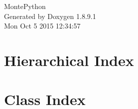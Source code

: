 \documentclass[twoside]{book}
\newcommand{\+}{\discretionary{\mbox{\scriptsize$\hookleftarrow$}}{}{}}
\newcommand{\clearemptydoublepage}{%
  \newpage{\pagestyle{empty}\cleardoublepage}%
}
\begin{document}
\hypersetup{pageanchor=false,
             bookmarks=true,
             bookmarksnumbered=true,
             pdfencoding=unicode
            }
\begin{titlepage}
\vspace*{7cm}
\begin{center}%
{\Large Monte\+Python }\\
\vspace*{1cm}
{\large Generated by Doxygen 1.8.9.1}\\
\vspace*{0.5cm}
{\small Mon Oct 5 2015 12:34:57}\\
\end{center}
\end{titlepage}
\clearemptydoublepage
\tableofcontents
\clearemptydoublepage
{}
\hypersetup{pageanchor=true}

\chapter{Hierarchical Index}

\chapter{Class Index}

\end{document}
